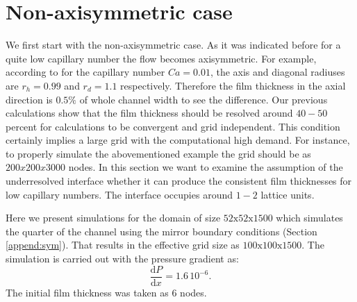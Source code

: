 \documentclass{article}
\begin{document}
\section{Non-axisymmetric case}
We first start with the non-axisymmetric case. As it was indicated before for a quite low capillary
number the flow becomes axisymmetric. For
example, according to \cite{heil-threedim} for the capillary
number $Ca=0.01$, the axis and diagonal radiuses are $r_h=0.99$ and $r_d=1.1$ respectively.
Therefore the film thickness in the axial direction is  $0.5\%$ of whole channel width to see the
difference. Our previous calculations \cite{kuzmin-binary2d} show that the film thickness should be
 resolved around $40-50$ percent for calculations to be convergent and grid independent. This
condition certainly implies a large grid with the computational high demand. For instance, to
properly simulate the abovementioned example the grid should be as 
$200x200x3000$ nodes. In this section we want to examine the assumption of the underresolved
interface whether it can produce the consistent film thicknesses for low capillary numbers. The
interface occupies around $1-2$ lattice units. 

Here we present simulations for the domain of size $52\mathrm{x}52\mathrm{x}1500$ which simulates
the quarter of the channel using the mirror boundary conditions (Section \ref{append:sym}). That
results in the effective grid size as $100\mathrm{x}100\mathrm{x}1500$. The simulation is carried
out with the pressure gradient as:
\begin{equation}
\frac{\mathrm{d}P}{\mathrm{d}x}=1.6\,10^{-6}.
\end{equation}
The initial film thickness was taken as $6$ nodes. 
\end{document}
